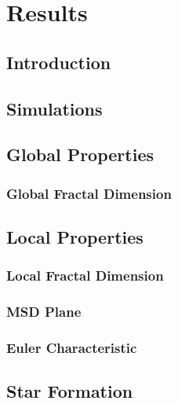 \chapter{Results}
\label{ch:results}

\section{Introduction}

\section{Simulations}

\section{Global Properties}

\subsection{Global Fractal Dimension}

\section{Local Properties}

\subsection{Local Fractal Dimension}

\subsection{MSD Plane}

\subsection{Euler Characteristic}

\section{Star Formation}